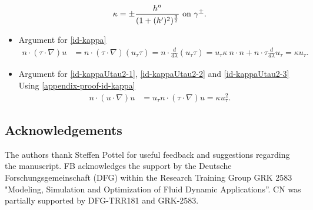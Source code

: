 \documentclass{article}
\theoremstyle{definition}
\theoremstyle{definition}
\begin{document}
\begin{itemize}
\begin{align}
            \kappa = \pm \frac{h''}{(1+(h')^2)^\frac{3}{2}} \textnormal{ on } \gamma^\pm.
        \end{align}
    \item Argument for \eqref{id-kappa}
        \begin{align}
            \label{appendix-proof-id-kappa}
            n\cdot(\tau\cdot \nabla) u
            &= n\cdot (\tau\cdot \nabla) (u_\tau \tau)
            = n\cdot \frac{d}{d\lambda} (u_\tau \tau)
            = u_\tau \kappa\ n\cdot n + n\cdot \tau \frac{d}{d\lambda}u_\tau =\kappa u_\tau.
        \end{align}
    \item Argument for \eqref{id-kappaUtau2-1}, \eqref{id-kappaUtau2-2} and \eqref{id-kappaUtau2-3}\\
    Using \eqref{appendix-proof-id-kappa}
        \begin{align}
            \label{appendix-proof-id-kappaUtau2}
            n\cdot(u\cdot \nabla) u
            &=u_{\tau} n\cdot (\tau\cdot \nabla) u = \kappa u_\tau^2.
        \end{align}
\end{itemize}


\subsection*{Acknowledgements}
The authors thank Steffen Pottel for useful feedback and suggestions regarding the manuscript.
FB acknowledges the support by the Deutsche Forschungsgemeinschaft (DFG) within the Research Training Group GRK 2583 "Modeling, Simulation and Optimization of Fluid Dynamic Applications”. CN was partially supported by DFG-TRR181 and GRK-2583. 
\printbibliography
\end{document}
